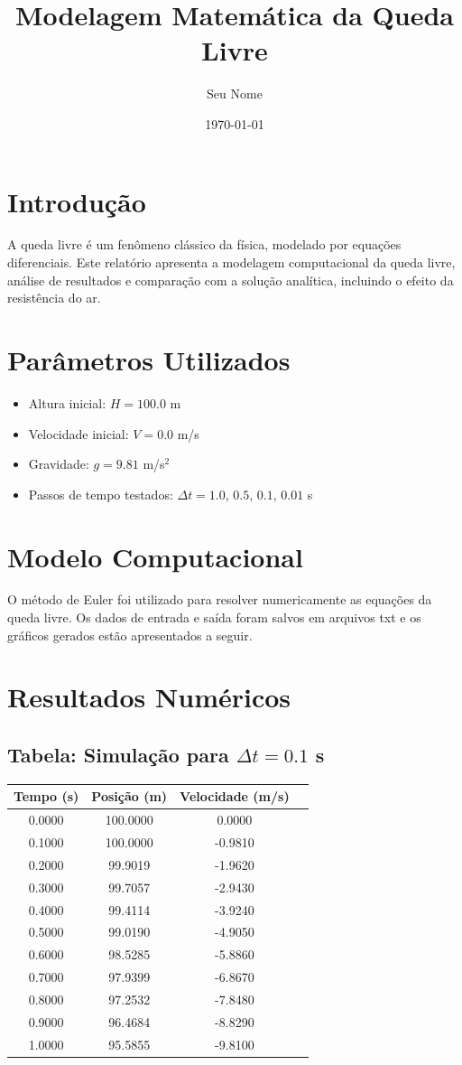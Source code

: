 \documentclass[a4paper,12pt]{article}
\title{Modelagem Matemática da Queda Livre}
\author{Seu Nome}
\date{\today}
\begin{document}
\maketitle

\section{Introdução}
A queda livre é um fenômeno clássico da física, modelado por equações diferenciais. Este relatório apresenta a modelagem computacional da queda livre, análise de resultados e comparação com a solução analítica, incluindo o efeito da resistência do ar.

\section{Parâmetros Utilizados}
\begin{itemize}
	\item Altura inicial: $H = 100.0$ m
	\item Velocidade inicial: $V = 0.0$ m/s
	\item Gravidade: $g = 9.81$ m/s$^2$
	\item Passos de tempo testados: $\Delta t = 1.0$, $0.5$, $0.1$, $0.01$ s
\end{itemize}

\section{Modelo Computacional}
O método de Euler foi utilizado para resolver numericamente as equações da queda livre. Os dados de entrada e saída foram salvos em arquivos txt e os gráficos gerados estão apresentados a seguir.

\section{Resultados Numéricos}
\subsection{Tabela: Simulação para $\Delta t = 0.1$ s}
\begin{tabular}{cccc}
\toprule
Tempo (s) & Posição (m) & Velocidade (m/s) \\
\midrule
0.0000 & 100.0000 & 0.0000 \\
0.1000 & 100.0000 & -0.9810 \\
0.2000 & 99.9019 & -1.9620 \\
0.3000 & 99.7057 & -2.9430 \\
0.4000 & 99.4114 & -3.9240 \\
0.5000 & 99.0190 & -4.9050 \\
0.6000 & 98.5285 & -5.8860 \\
0.7000 & 97.9399 & -6.8670 \\
0.8000 & 97.2532 & -7.8480 \\
0.9000 & 96.4684 & -8.8290 \\
1.0000 & 95.5855 & -9.8100 \\
\bottomrule
\end{tabular}
\end{document}
